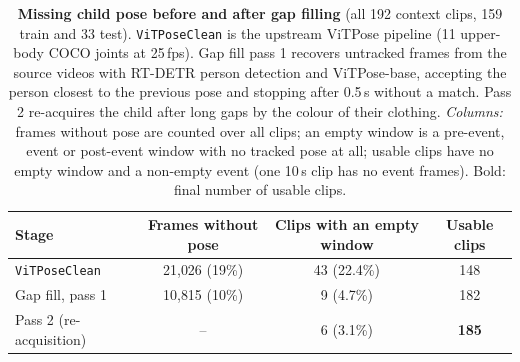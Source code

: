 \documentclass[11pt]{article}
\newcommand{\code}[1]{\texttt{#1}}
\newcommand{\best}[1]{\textbf{#1}}
\begin{document}
\clearpage

\begin{table}[!htbp]
\centering
\caption{\textbf{Missing child pose before and after gap filling} (all 192 context clips, 159 train and 33 test).
\code{ViTPoseClean} is the upstream ViTPose pipeline (11 upper-body COCO joints at 25\,fps). Gap fill pass 1 recovers untracked frames from the source videos with RT-DETR person detection and ViTPose-base, accepting the person closest to the previous pose and stopping after 0.5\,s without a match. Pass 2 re-acquires the child after long gaps by the colour of their clothing.
\emph{Columns:} frames without pose are counted over all clips; an empty window is a pre-event, event or post-event window with no tracked pose at all; usable clips have no empty window and a non-empty event (one 10\,s clip has no event frames). Bold: final number of usable clips.}
\label{tab:gapfill}
\begin{tabular}{lccc}
\toprule
Stage & Frames without pose & Clips with an empty window & Usable clips \\
\midrule
\code{ViTPoseClean} & 21{,}026 (19\%) & 43 (22.4\%) & 148 \\
Gap fill, pass 1 & 10{,}815 (10\%) & 9 (4.7\%) & 182 \\
Pass 2 (re-acquisition) & -- & 6 (3.1\%) & \best{185} \\
\bottomrule
\end{tabular}
\end{table}
\end{document}
